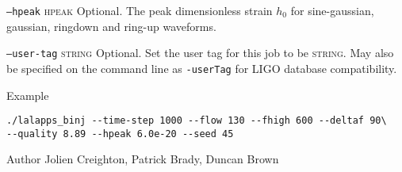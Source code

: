 \begin{entry}
\begin{entry}
\item[\texttt{--hpeak} \textsc{hpeak}]
Optional.  The peak dimensionless strain $h_0$ for sine-gaussian,  gaussian,  ringdown and
ring-up waveforms.

\item[\texttt{--user-tag} \textsc{string}] Optional. Set the user tag for this
job to be \textsc{string}. May also be specified on the command line as 
\texttt{-userTag} for LIGO database compatibility.

\end{entry}

\item[Example]
\begin{verbatim}
./lalapps_binj --time-step 1000 --flow 130 --fhigh 600 --deltaf 90\
--quality 8.89 --hpeak 6.0e-20 --seed 45
\end{verbatim}

\item[Author] 
Jolien Creighton, Patrick Brady, Duncan Brown
\end{entry}

